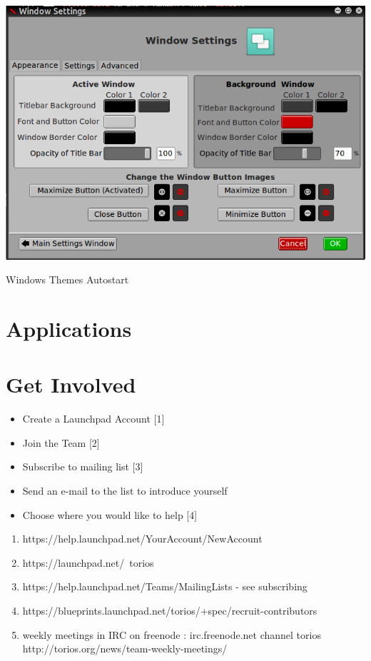 \documentclass[12pt,a4paper]{book}
\begin{document}
\begin{center}
\includegraphics[width=0.7\linewidth]{window-settings}
\end{center}










{Windows}
{Themes}
{Autostart}


\chapter{Applications}

\chapter{Get Involved}

\begin{itemize}
\item{Create a Launchpad Account [1]}
\item{Join the Team [2]}
\item{Subscribe to mailing list [3]}
\item{Send an e-mail to the list to introduce yourself}
\item{Choose where you would like to help [4]}
\end{itemize}


\begin{enumerate}
\item {https://help.launchpad.net/YourAccount/NewAccount}
\item {https://launchpad.net/~torios}
\item {https://help.launchpad.net/Teams/MailingLists - see subscribing}
\item{https://blueprints.launchpad.net/torios/+spec/recruit-contributors}
\item{weekly meetings in IRC on freenode : irc.freenode.net  channel torios http://torios.org/news/team-weekly-meetings/ }

\end{enumerate}
\end{document}

